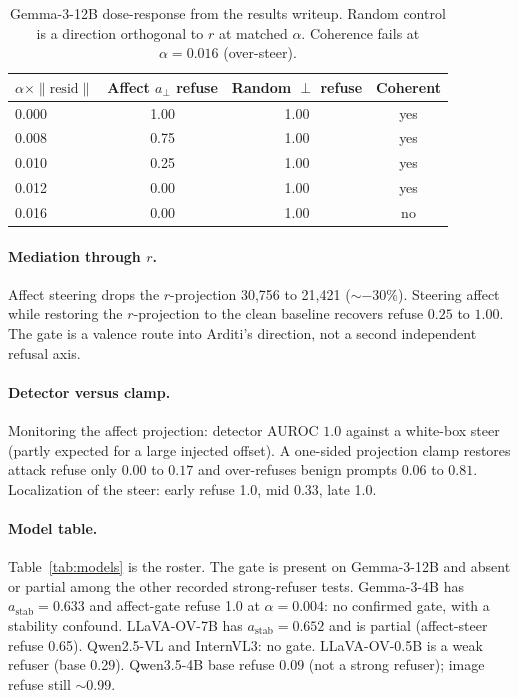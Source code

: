 \documentclass{article}
\begin{document}
\begin{table}[t]
\caption{Gemma-3-12B dose-response from the results writeup. Random control is a direction orthogonal to $r$ at matched $\alpha$. Coherence fails at $\alpha=0.016$ (over-steer).}
\label{tab:dose}
\centering
\small
\begin{tabular}{@{}lccc@{}}
\toprule
$\alpha\times\|\mathrm{resid}\|$ & Affect $a_\perp$ refuse & Random $\perp$ refuse & Coherent \\
\midrule
0.000 & 1.00 & 1.00 & yes \\
0.008 & 0.75 & 1.00 & yes \\
0.010 & 0.25 & 1.00 & yes \\
0.012 & 0.00 & 1.00 & yes \\
0.016 & 0.00 & 1.00 & no \\
\bottomrule
\end{tabular}
\end{table}

\paragraph{Mediation through $r$.}
Affect steering drops the $r$-projection 30{,}756 to 21{,}421 ($\sim$$-30\%$). Steering affect while restoring the $r$-projection to the clean baseline recovers refuse $0.25$ to $1.00$. The gate is a valence route into Arditi's direction, not a second independent refusal axis.

\paragraph{Detector versus clamp.}
Monitoring the affect projection: detector AUROC $1.0$ against a white-box steer (partly expected for a large injected offset). A one-sided projection clamp restores attack refuse only $0.00$ to $0.17$ and over-refuses benign prompts $0.06$ to $0.81$. Localization of the steer: early refuse 1.0, mid 0.33, late 1.0.

\paragraph{Model table.}
Table~\ref{tab:models} is the roster. The gate is present on Gemma-3-12B and absent or partial among the other recorded strong-refuser tests. Gemma-3-4B has $a_{\mathrm{stab}}=0.633$ and affect-gate refuse 1.0 at $\alpha=0.004$: no confirmed gate, with a stability confound. LLaVA-OV-7B has $a_{\mathrm{stab}}=0.652$ and is partial (affect-steer refuse 0.65). Qwen2.5-VL and InternVL3: no gate. LLaVA-OV-0.5B is a weak refuser (base 0.29). Qwen3.5-4B base refuse 0.09 (not a strong refuser); image refuse still $\sim$0.99.
\end{document}
